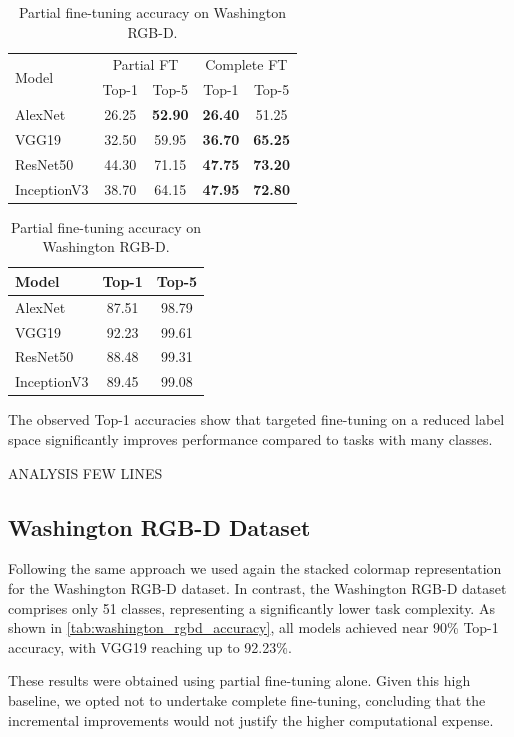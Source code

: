 \begin{table}[htbp]
    \centering
    \begin{minipage}[t]{0.48\textwidth}
        \centering
        \begin{tabular}{|l|c|c|c|c|}
            \hline
            \multirow{2}{*}{Model} & \multicolumn{2}{|c|}{Partial FT} & \multicolumn{2}{|c|}{Complete FT} \\ \cline{2-5}
             & Top-1 & Top-5 & Top-1 & Top-5 \\
            \hline
            AlexNet & 26.25 & \textbf{52.90} & \textbf{26.40} & 51.25 \\
            \hline
            VGG19 & 32.50 & 59.95 & \textbf{36.70} & \textbf{65.25} \\
            \hline
            ResNet50 & 44.30 & 71.15 & \textbf{47.75} & \textbf{73.20} \\
            \hline
            InceptionV3 & 38.70 & 64.15 & \textbf{47.95} & \textbf{72.80} \\
            \hline
        \end{tabular}
        \caption{Accuracy on 200-class ImageNet subset.}
        \label{tab:imagenet_subset_accuracy}
    \end{minipage}
    \hfill
    \begin{minipage}[t]{0.48\textwidth}
        \centering
        \begin{tabular}{|l|c|c|}
            \hline
            Model & Top-1 & Top-5 \\
            \hline
            AlexNet & 87.51 & 98.79 \\
            \hline
            VGG19 & 92.23 & 99.61 \\
            \hline
            ResNet50 & 88.48 & 99.31 \\
            \hline
            InceptionV3 & 89.45 & 99.08 \\
            \hline
        \end{tabular}
        \caption{Partial fine-tuning accuracy on Washington RGB-D.}
        \label{tab:washington_rgbd_accuracy}
    \end{minipage}
\end{table}

The observed {Top-1} accuracies show that targeted fine-tuning on a reduced label space significantly improves performance compared to tasks with many classes.

ANALYSIS FEW LINES

\subsection{Washington RGB-D Dataset}
Following the same approach we used again the stacked colormap representation for the Washington RGB-D dataset.
In contrast, the Washington RGB-D dataset comprises only {51 classes}, representing a significantly {lower task complexity}. As shown in \autoref{tab:washington_rgbd_accuracy}, all models achieved near 90\% Top-1 accuracy, with VGG19 reaching up to 92.23\%.



These results were obtained using {partial fine-tuning alone}. Given this high baseline, we opted not to undertake complete fine-tuning, concluding that the incremental improvements would not justify the higher computational expense.
